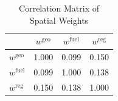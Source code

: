 \begin{table}[!htbp]
\centering
\caption{Correlation Matrix of Spatial Weights}
\label{tab:weight_corr}
\begin{tabular}{lccc}
\toprule
 & $w^{\mathrm{geo}}$ & $w^{\mathrm{fuel}}$ & $w^{\mathrm{reg}}$ \\
\midrule
$w^{\mathrm{geo}}$ & 1.000 & 0.099 & 0.150 \\
$w^{\mathrm{fuel}}$ & 0.099 & 1.000 & 0.138 \\
$w^{\mathrm{reg}}$ & 0.150 & 0.138 & 1.000 \\
\bottomrule
\end{tabular}
\end{table}